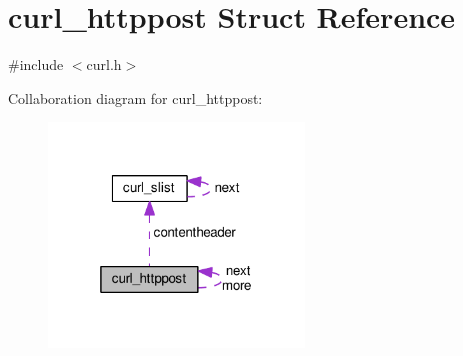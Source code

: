 \hypertarget{structcurl__httppost}{}\section{curl\+\_\+httppost Struct Reference}
\label{structcurl__httppost}


{\ttfamily \#include $<$curl.\+h$>$}



Collaboration diagram for curl\+\_\+httppost\+:
\nopagebreak
\begin{figure}[H]
\begin{center}
\leavevmode
\includegraphics[width=193pt]{structcurl__httppost__coll__graph}
\end{center}
\end{figure}
